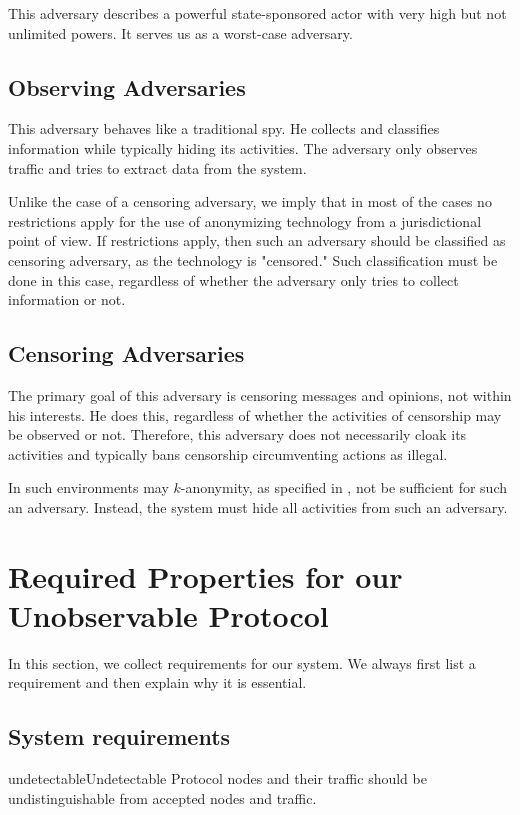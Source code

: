 This adversary describes a powerful state-sponsored actor with very high but not unlimited powers. It serves us as a worst-case adversary.

\subsection{Observing Adversaries}
This adversary behaves like a traditional spy. He collects and classifies information while typically hiding its activities. The adversary only observes traffic and tries to extract data from the system.

Unlike the case of a censoring adversary, we imply that in most of the cases no restrictions apply for the use of anonymizing technology from a jurisdictional point of view. If restrictions apply, then such an adversary should be classified as censoring adversary, as the technology is "censored." Such classification must be done in this case, regardless of whether the adversary only tries to collect information or not.

\subsection{Censoring Adversaries}
The primary goal of this adversary is censoring messages and opinions, not within his interests. He does this, regardless of whether the activities of censorship may be observed or not. Therefore, this adversary does not necessarily cloak its activities and typically bans censorship circumventing actions as illegal.

In such environments may $k$-anonymity, as specified in \cite{k-anonymous:ccs2003}, not be sufficient for such an adversary. Instead, the \MessageVortex system must hide all activities from such an adversary.

\section{Required Properties for our Unobservable Protocol}

In this section, we collect requirements for our system. We always first list a requirement and then explain why it is essential.

\subsection{System requirements\label{sec:requirements}}

\begin{requirement}{undetectable}{Undetectable}
	Protocol nodes and their traffic should be undistinguishable from accepted nodes and traffic. 
\end{requirement}

